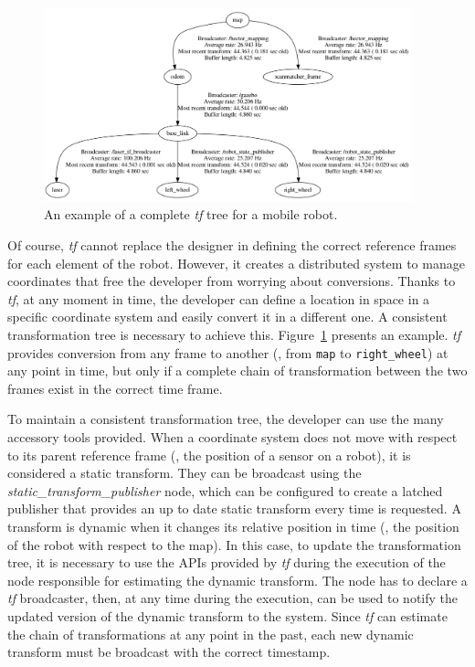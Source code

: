 \begin{figure}[t]
    \centering
    \includegraphics[width=0.95\textwidth]{gfx/ros/tf_tree}
    \caption{An example of a complete \textit{tf} tree for a mobile robot.}\label{fig:ros-tf-tree}
\end{figure}

Of course, \textit{tf} cannot replace the designer in defining the correct reference frames for each element of the robot. However, it creates a distributed system to manage coordinates that free the developer from worrying about conversions. Thanks to \textit{tf}, at any moment in time, the developer can define a location in space in a specific coordinate system and easily convert it in a different one. A  consistent transformation tree is necessary to achieve this. Figure~\ref{fig:ros-tf-tree} presents an example. \textit{tf} provides conversion from any frame to another (\eg, from \texttt{map} to \texttt{right\_wheel}) at any point in time, but only if a complete chain of transformation between the two frames exist in the correct time frame.

To maintain a consistent transformation tree, the developer can use the many accessory tools provided. When a coordinate system does not move with respect to its parent reference frame (\eg, the position of a sensor on a robot), it is considered a static transform. They can be broadcast using the \textit{static\_transform\_publisher} node, which can be configured to create a latched publisher that provides an up to date static transform every time is requested. A transform is dynamic when it changes its relative position in time (\eg, the position of the robot with respect to the map). In this case, to update the transformation tree, it is necessary to use the APIs provided by \textit{tf} during the execution of the node responsible for estimating the dynamic transform. The node has to declare a \textit{tf} broadcaster, then, at any time during the execution, can be used to notify the updated version of the dynamic transform to the system.  Since \textit{tf} can estimate the chain of transformations at any point in the past, each new dynamic transform must be broadcast with the correct timestamp.

